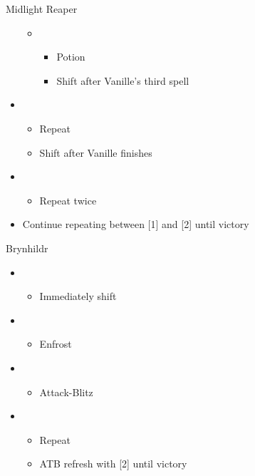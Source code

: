 \begin{battle}[1:10]{Midlight Reaper}
\begin{itemize}
\begin{itemize}
\begin{itemize}
				            \end{itemize}
				      \item \sixth
				            \begin{itemize}
					            \item Potion
					            \item Shift after Vanille's third spell
				            \end{itemize}
			      \end{itemize}
			\item \first
			      \begin{itemize}
				      \item Repeat
				      \item Shift after Vanille finishes
			      \end{itemize}
			\item \second
			      \begin{itemize}
				      \item Repeat twice
			      \end{itemize}
			\item Continue repeating between [1] and [2] until victory
		\end{itemize}
	\end{battle}

	\begin{battle}[0:52]{Brynhildr}
		\begin{itemize}
			\item \first
			      \begin{itemize}
				      \item Immediately shift
			      \end{itemize}
			\item \third
			      \begin{itemize}
				      \item Enfrost
			      \end{itemize}
			\item \first
			      \begin{itemize}
				      \item Attack-Blitz
			      \end{itemize}
			\item \second
			      \begin{itemize}
				      \item Repeat
				      \item ATB refresh with [2] until victory
			      \end{itemize}
		\end{itemize}
	\end{battle}
